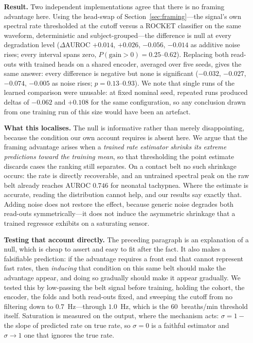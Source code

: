 \documentclass[journal]{IEEEtran}
\begin{document}
\textbf{Result.} Two independent implementations agree that there is no framing advantage here. Using
the head-swap of Section~\ref{sec:framing}---the signal's own spectral rate thresholded at the cutoff
versus a ROCKET classifier on the same waveform, deterministic and subject-grouped---the difference is
null at every degradation level ($\Delta$AUROC ${+}0.014$, ${+}0.026$, ${-}0.056$, ${-}0.014$ as
additive noise rises; every interval spans zero, $P(\text{gain}{>}0)=0.25$--$0.62$). Replacing both
read-outs with trained heads on a shared encoder, averaged over five seeds, gives the same answer:
every difference is negative but none is significant (${-}0.032$, ${-}0.027$, ${-}0.074$, ${-}0.005$ as
noise rises; $p=0.13$--$0.93$). We note that single runs of the learned comparison were unusable: at fixed nominal
seed, repeated runs produced deltas of ${-}0.062$ and ${+}0.108$ for the same configuration, so any
conclusion drawn from one training run of this size would have been an artefact.

\textbf{What this localises.} The null is informative rather than merely disappointing, because the
condition our own account requires is absent here. We argue that the framing advantage arises when a
\emph{trained rate estimator shrinks its extreme predictions toward the training mean}, so that
thresholding the point estimate discards cases the ranking still separates. On a contact belt no such
shrinkage occurs: the rate is directly recoverable, and an untrained spectral peak on the raw belt
already reaches AUROC $0.746$ for neonatal tachypnea. Where the estimate is accurate, reading the
distribution cannot help, and our results say exactly that. Adding noise does not restore the effect,
because generic noise degrades both read-outs symmetrically---it does not induce the asymmetric
shrinkage that a trained regressor exhibits on a saturating sensor.

\textbf{Testing that account directly.} The preceding paragraph is an explanation of a null, which is
cheap to assert and easy to fit after the fact. It also makes a falsifiable prediction: if the
advantage requires a front end that cannot represent fast rates, then \emph{inducing} that condition on
this same belt should make the advantage appear, and doing so gradually should make it appear
gradually. We tested this by low-passing the belt signal before training, holding the cohort, the
encoder, the folds and both read-outs fixed, and sweeping the cutoff from no filtering down to
$0.7$~Hz---through $1.0$~Hz, which is the $60$~breaths/min threshold itself. Saturation is measured on
the output, where the mechanism acts: $\sigma = 1 - $ the slope of predicted rate on true rate, so
$\sigma=0$ is a faithful estimator and $\sigma\to1$ one that ignores the true rate.
\end{document}
